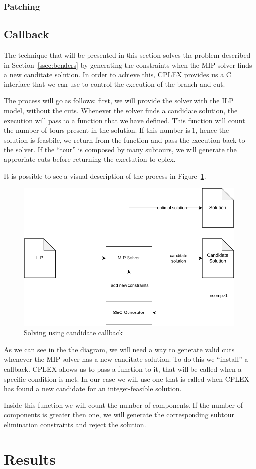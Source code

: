 \documentclass{article}
\begin{document}
\subsubsection{Patching}


\subsection{Callback}
The technique that will be presented in this section solves the problem
described in Section~\ref{ssec:benders} by generating the constraints when
the MIP solver finds a new canditate solution. In order to achieve this,
CPLEX provides us a C interface that we can use to control the execution
of the branch-and-cut.

The process will go as follows: first, we will provide the solver with the
ILP model, without the cuts. Whenever the solver finds a candidate solution,
the execution will pass to a function that we have defined. This function
will count the number of tours present in the solution. If this number is $1$,
hence the solution is feasbile, we return from the function and pass the
execution back to the solver. If the ``tour'' is composed by many subtours,
we will generate the approriate cuts before returning the exectution to
cplex.

It is possible to see a visual description of the process in
Figure~\ref{fig:callback}.

\begin{figure}[h]
        \caption{Solving using candidate callback}
        \label{fig:callback}
        \centering
        \includegraphics[width=340pt]{assets/callback.drawio.pdf}
\end{figure}

As we can see in the the diagram, we will need a way to generate valid cuts
whenever the MIP solver has a new canditate solution. To do this we ``install''
a callback. CPLEX allows us to pass a function to it, that will be called when
a specific condition is met. In our case we will use one that is called when CPLEX
has found a new candidate for an integer-feasible solution.

Inside this function we will count the number of components. If the number of
components is greater then one, we will generate the corresponding subtour
elimination constraints and reject the solution.

\section{Results}
\label{sec:results}
\end{document}

